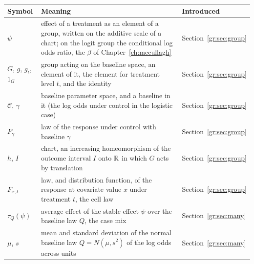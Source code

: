 {\noindent\small\centering
\setlength{\tabcolsep}{4pt}\renewcommand{\arraystretch}{1.1}
\begin{tabular}{>{\raggedright\arraybackslash}p{1.0in}>{\raggedright\arraybackslash}p{2.15in}>{\raggedright\arraybackslash}p{0.95in}}
\toprule
Symbol & Meaning & Introduced \\
\midrule
$\psi$ & effect of a treatment as an element of a group, written on the additive scale of a chart; on the logit group the conditional log odds ratio, the $\beta$ of Chapter~\ref{ch:mccullagh} & Section~\ref{gr:sec:group} \\
$G$, $g$, $g_t$, $1_G$ & group acting on the baseline space, an element of it, the element for treatment level $t$, and the identity & Section~\ref{gr:sec:group} \\
$\mathcal C$, $\gamma$ & baseline parameter space, and a baseline in it (the log odds under control in the logistic case) & Section~\ref{gr:sec:group} \\
$P_\gamma$ & law of the response under control with baseline $\gamma$ & Section~\ref{gr:sec:group} \\
$h$, $I$ & chart, an increasing homeomorphism of the outcome interval $I$ onto $\mathbb{R}$ in which $G$ acts by translation & Section~\ref{gr:sec:group} \\
$F_{x,t}$ & law, and distribution function, of the response at covariate value $x$ under treatment $t$, the cell law & Section~\ref{gr:sec:group} \\
$\tau_Q(\psi)$ & average effect of the stable effect $\psi$ over the baseline law $Q$, the case mix & Section~\ref{gr:sec:many} \\
$\mu$, $s$ & mean and standard deviation of the normal baseline law $Q=N(\mu,s^2)$ of the log odds across units & Section~\ref{gr:sec:many} \\
\end{tabular}\par}

